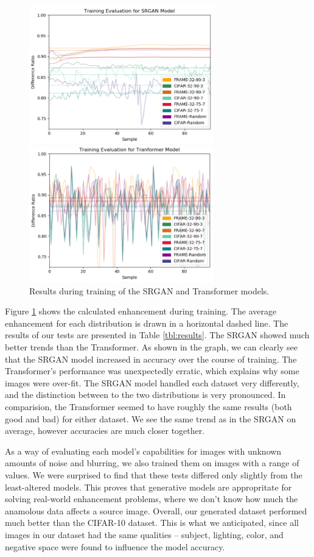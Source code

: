 \documentclass[letterpaper]{article} %
\begin{document}
\begin{figure}[h!]
\centerline{\includegraphics[width=8cm]{srgan_training_results.png}}
\centerline{\includegraphics[width=8cm]{attn_training_results.png}}
\caption{Results during training of the SRGAN and Transformer models.}
\label{fig:training_results}
\end{figure}

Figure \ref{fig:training_results} shows the calculated enhancement
during training.
The average enhancement for each distribution is drawn in
a horizontal dashed line.
The results of our tests are presented in Table \ref{tbl:results}.
The SRGAN showed much better trends than the Transformer.
As shown in the graph, we can clearly see that the SRGAN model increased in accuracy over the course of training.
The Transformer's performance was unexpectedly erratic, which explains why some images were over-fit.
The SRGAN model handled each dataset very differently,
and the distinction between to the two distributions is very pronounced.
In comparision, the Transformer seemed to have roughly the same results (both good and bad)
for either dataset. We see the same trend as in the SRGAN on average, however accuracies are much closer together.

As a way of evaluating each model's capabilities for images with unknown amounts of
noise and blurring, we also trained them on images with a range of values.
We were surprised to find that these tests differed only slightly from the least-altered models.
This proves that generative models are appropritate for solving real-world enhancement
problems, where we don't know how much the anamolous data affects a source image.
Overall, our generated dataset performed much better than the CIFAR-10 dataset.
This is what we anticipated, since all images in our dataset had the same qualities --
subject, lighting, color, and negative space were found to influence the model accuracy.
\end{document}
